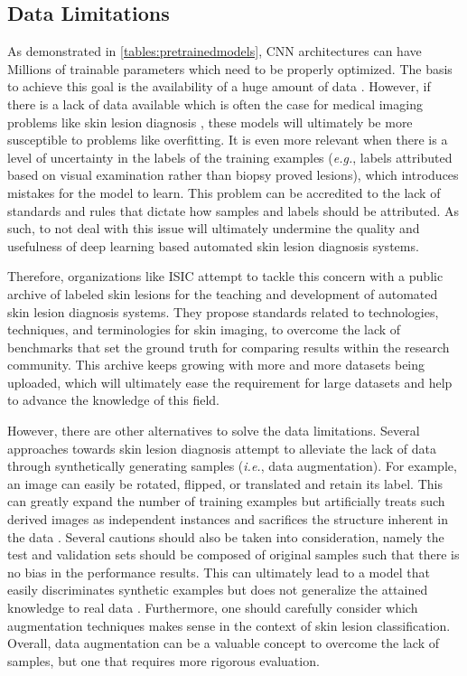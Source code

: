     \subsection{Data Limitations}
    
    As demonstrated in \autoref{tables:pretrainedmodels}, \ac{CNN} architectures can have Millions of trainable parameters which need to be properly optimized. The basis to achieve this goal is the availability of a huge amount of data \cite{Miotto2017}. However, if there is a lack of data available which is often the case for medical imaging problems like skin lesion diagnosis \cite{Celebi2019}, these models will ultimately be more susceptible to problems like overfitting. It is even more relevant when there is a level of uncertainty in the labels of the training examples (\textit{e.g.}, labels attributed based on visual examination rather than biopsy proved lesions), which introduces mistakes for the model to learn. This problem can be accredited to the lack of standards and rules that dictate how samples and labels should be attributed. As such, to not deal with this issue will ultimately undermine the quality and usefulness of deep learning based automated skin lesion diagnosis systems. \par

    Therefore, organizations like \ac{ISIC} attempt to tackle this concern with a public archive of labeled skin lesions for the teaching and development of automated skin lesion diagnosis systems. They propose standards related to technologies, techniques, and terminologies for skin imaging, to overcome the lack of benchmarks that set the ground truth for comparing results within the research community. This archive keeps growing with more and more datasets being uploaded, which will ultimately ease the requirement for large datasets and help to advance the knowledge of this field. \par
    
    However, there are other alternatives to solve the data limitations. Several approaches towards skin lesion diagnosis attempt to alleviate the lack of data through synthetically generating samples (\textit{i.e.}, data augmentation). For example, an image can easily be rotated, flipped, or translated and retain its label. This can greatly expand the number of training examples but artificially treats such derived images as independent instances and sacrifices the structure inherent in the data \cite{Ching2018}. Several cautions should also be taken into consideration, namely the test and validation sets should be composed of original samples such that there is no bias in the performance results. This can ultimately lead to a model that easily discriminates synthetic examples but does not generalize the attained knowledge to real data \cite{Ching2018}. Furthermore, one should carefully consider which augmentation techniques makes sense in the context of skin lesion classification. Overall, data augmentation can be a valuable concept to overcome the lack of samples, but one that requires more rigorous evaluation. \par
    
